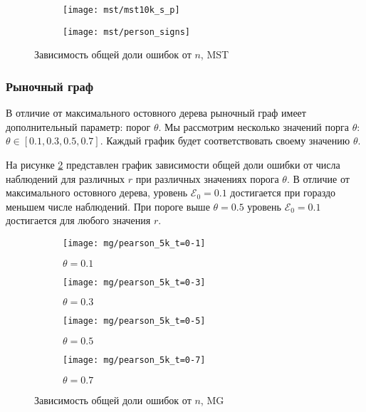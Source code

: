 \begin{figure}[H]
     \centering
     \begin{subfigure}[b]{0.49\textwidth}
         \centering
         \texttt{[image: mst/mst10k\_s\_p]}
     \end{subfigure}
     \hfill
     \begin{subfigure}[b]{0.49\textwidth}
         \centering
         \texttt{[image: mst/person\_signs]}
     \end{subfigure}
     

        \caption{Зависимость общей доли ошибок от $n$, MST}
        \label{fig:exp/mst/pearson_signs}
\end{figure}  


\subsubsection{Рыночный граф}
В отличие от максимального остовного дерева рыночный граф имеет дополнительный параметр: порог $\theta$. Мы рассмотрим несколько значений порга $\theta$: $\theta \in [0.1, 0.3, 0.5, 0.7]$. Каждый график будет соответствовать своему значению $\theta$.

На рисунке \ref{fig:exp/mg/5k} представлен график зависимости общей доли ошибки от числа наблюдений для различных $r$ при различных значениях порога $\theta$. В отличие от максимального остовного дерева, уровень $\mathcal{E}_0=0.1$ достигается при гораздо меньшем числе наблюдений. При пороге выше $\theta=0.5$ уровень $\mathcal{E}_0=0.1$ достигается для любого значения $r$.


\begin{figure}[H]
     \centering
     \begin{subfigure}[b]{0.49\textwidth}
         \centering
         \texttt{[image: mg/pearson\_5k\_t=0-1]}
         \caption{$\theta=0.1$}
     \end{subfigure}
     \hfill
     \begin{subfigure}[b]{0.49\textwidth}
         \centering
         \texttt{[image: mg/pearson\_5k\_t=0-3]}
         \caption{$\theta=0.3$}
     \end{subfigure}
     \vfill
     \begin{subfigure}[b]{0.49\textwidth}
         \centering
         \texttt{[image: mg/pearson\_5k\_t=0-5]}
         \caption{$\theta=0.5$}
     \end{subfigure}
     \hfill
     \begin{subfigure}[b]{0.49\textwidth}
         \centering
         \texttt{[image: mg/pearson\_5k\_t=0-7]}
         \caption{$\theta=0.7$}
     \end{subfigure}
     

        \caption{Зависимость общей доли ошибок от $n$, MG}
        \label{fig:exp/mg/5k}
\end{figure}  


